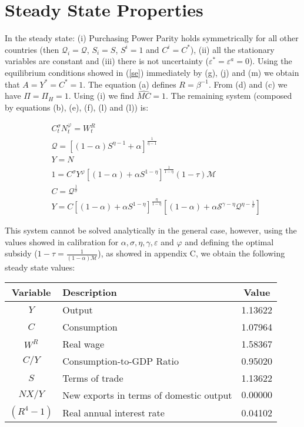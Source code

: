 \documentclass{article}
\begin{document}
\section{Steady State Properties}
In the steady state: (i) Purchasing Power Parity holds symmetrically for all other countries (then $\mathcal Q_i = \mathcal Q$, $S_i = S$, $S^i=1$ and $C^i = C^*$), (ii) all the stationary variables are constant and (iii) there is not uncertainty ($\varepsilon^* = \varepsilon^a = 0$).  Using the equilibrium conditions showed in (\ref{se}) immediately by (g), (j) and (m) we obtain that $A = Y^* = C^* = 1$. The equation (a) defines $R = \beta^{-1}$. From (d) and (c) we have $\Pi = \Pi_H = 1$. Using (i) we find $\widehat{MC} = 1$. The remaining system (composed by equations (b), (e), (f), (l) and (l)) is:

\begin{subequations}
    \label{ser}
    \begin{align}
        & C_t^\sigma N_t^\varphi = W_t^R \\
        &\mathcal{Q} = \left[(1-\alpha)S^{\eta-1} + \alpha \right]^{\frac{1}{\eta-1}}\\
        &Y =  N\\
        &1 = C^\sigma Y^\varphi \left[(1-\alpha) + \alpha S^{1-\eta} \right]^{\frac{1}{1-\eta}} (1 - \tau) \mathcal M\\
        &C = \mathcal Q^{\frac{1}{\sigma}}\\
        &Y = C \left[(1-\alpha) + \alpha S^{1-\eta} \right]^{\frac{\eta}{1-\eta}} \left[(1-\alpha)  +  \alpha \mathcal S^{\gamma - \eta} \mathcal Q^{\eta - \frac{1}{\sigma}} \right]
    \end{align}
\end{subequations}

This system cannot be solved analytically in the general case, however, using the values showed in calibration for $\alpha, \sigma, \eta, \gamma, \varepsilon$ and $\varphi$ and defining the optimal subsidy ($ 1-\tau = \frac{1}{(1-\alpha)\mathcal M}  $), as showed in appendix C, we obtain the following steady state values:

\begin{table}[H]
    \centering
    \begin{tabular}{clc}
        \hline
        \textbf{Variable} & \textbf{Description} & \textbf{Value}\\
        \hline
        $Y$ & Output & 1.13622 \\
        $C$ & Consumption & 1.07964 \\
        $W^R$ & Real wage & 1.58367 \\
        $C/Y$ & Consumption-to-GDP Ratio & 0.95020 \\
        $S$ & Terms of trade & 1.13622 \\
        $NX/Y$ & New exports in terms of domestic output & $0.00000$\\
        $(R^4 -1)$ & Real annual interest rate &  0.04102\\
        \hline
    \end{tabular}
\end{table}
\end{document}

